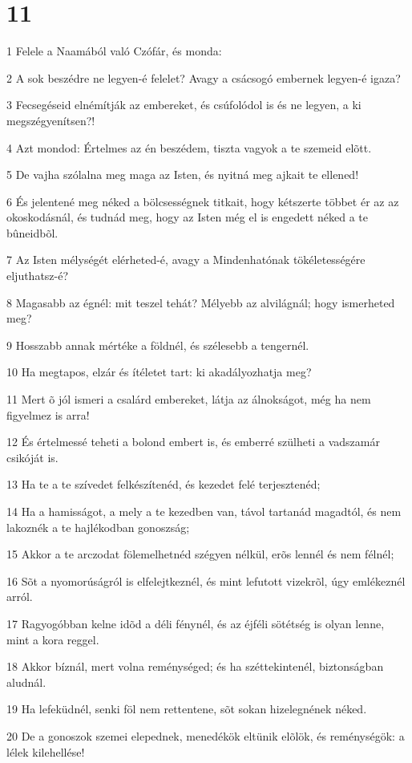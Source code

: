 \chapter{11}

\par 1 Felele a Naamából való Czófár, és monda:
\par 2 A sok beszédre ne legyen-é felelet? Avagy a csácsogó embernek legyen-é igaza?
\par 3 Fecsegéseid elnémítják az embereket, és csúfolódol is és ne legyen, a ki megszégyenítsen?!
\par 4 Azt mondod: Értelmes az én beszédem, tiszta vagyok a te szemeid elõtt.
\par 5 De vajha szólalna meg maga az Isten, és nyitná meg ajkait te ellened!
\par 6 És jelentené meg néked a bölcsességnek titkait, hogy kétszerte többet ér az az okoskodásnál, és tudnád meg, hogy az Isten még el is engedett néked a te bûneidbõl.
\par 7 Az Isten mélységét elérheted-é, avagy a Mindenhatónak tökéletességére eljuthatsz-é?
\par 8 Magasabb az égnél: mit teszel tehát? Mélyebb az alvilágnál; hogy ismerheted meg?
\par 9 Hosszabb annak mértéke a földnél, és szélesebb a tengernél.
\par 10 Ha megtapos, elzár és ítéletet tart: ki akadályozhatja meg?
\par 11 Mert õ jól ismeri a csalárd embereket, látja az álnokságot, még ha nem figyelmez is arra!
\par 12 És értelmessé teheti a bolond embert is, és emberré szülheti a vadszamár csikóját is.
\par 13 Ha te a te szívedet felkészítenéd, és kezedet felé terjesztenéd;
\par 14 Ha a hamisságot, a mely a te kezedben van, távol tartanád magadtól, és nem lakoznék a te hajlékodban gonoszság;
\par 15 Akkor a te arczodat fölemelhetnéd szégyen nélkül, erõs lennél és nem félnél;
\par 16 Sõt a nyomorúságról is elfelejtkeznél, és mint lefutott vizekrõl, úgy emlékeznél arról.
\par 17 Ragyogóbban kelne idõd a déli fénynél, és az éjféli sötétség is olyan lenne, mint a kora reggel.
\par 18 Akkor bíznál, mert volna reménységed; és ha széttekintenél, biztonságban aludnál.
\par 19 Ha lefeküdnél, senki föl nem rettentene, sõt sokan hizelegnének néked.
\par 20 De a gonoszok szemei elepednek, menedékök eltünik elõlök, és reménységök: a lélek kilehellése!

